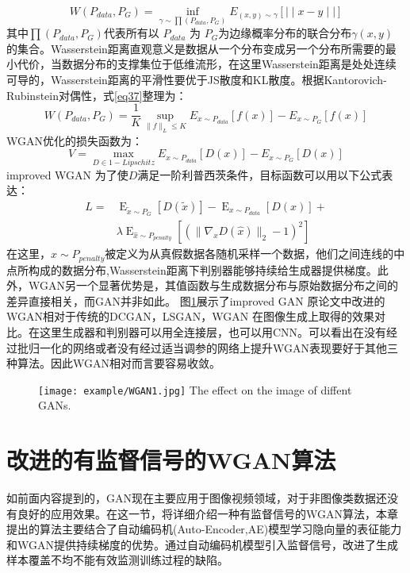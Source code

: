 \begin{equation}
\label{eq37}
W(P_{data},P_{G})= \inf \limits_{\gamma \sim \prod (P_{data},P_{G})} E_{(x,y)\sim\gamma}[\mid\mid x-y\mid\mid]
\end{equation}
其中${ \prod (P_{data},P_{G})}$代表所有以 $P_{data}$ 为 $P_{G}$为边缘概率分布的联合分布$\gamma(x,y)$ 的集合。Wasserstein距离直观意义是数据从一个分布变成另一个分布所需要的最小代价，当数据分布的支撑集位于低维流形，在这里Wasserstein距离是处处连续可导的，Wasserstein距离的平滑性要优于JS散度和KL散度。根据Kantorovich-Rubinstein对偶性，式\ref{eq37}整理为：
\begin{equation}
\label{eq38}
W(P_{data},P_{G})= \frac{1}{K} \sup \limits_{\| f \| _{L} \leq K} E_{x\sim P_{data}}[f(x)]-E_{x\sim P_{G}}[f(x)]
\end{equation}
WGAN优化的损失函数为：
\begin{equation}
\label{eq39}
V= \max \limits_{D\in 1- Lipschitz} E_{x\sim P_{data}}[D(x)]-E_{x\sim P_{G}}[D(x)]
\end{equation}
improved WGAN 为了使$D$满足一阶利普西茨条件，目标函数可以用以下公式表达：
\begin{equation}
\label{eq10}
\begin{aligned}
L=&\mathop{E}_{\tilde{x} \sim P_{G}}[D( \tilde{x})]- \mathop{E}_{x \sim P_{data}}[D(x)]+ \\&\lambda \mathop{E}_{\hat{x}\sim P_{ {penalty}}} [(\| \nabla _{  \hat{x}} D(\hat{x}) \|_{2} - 1)^{2}]
\end{aligned}
\end{equation}
在这里，$\hat{x}\sim P_{ {penalty}}$被定义为从真假数据各随机采样一个数据，他们之间连线的中点所构成的数据分布,Wasserstein距离下判别器能够持续给生成器提供梯度。此外，WGAN另一个显著优势是，其值函数与生成数据分布与原始数据分布之间的差异直接相关，而GAN并非如此。
图\ref{fig:GAN1}展示了improved GAN 原论文中改进的WGAN相对于传统的DCGAN，LSGAN，WGAN 在图像生成上取得的效果对比。在这里生成器和判别器可以用全连接层，也可以用CNN。可以看出在没有经过批归一化的网络或者没有经过适当调参的网络上提升WGAN表现要好于其他三种算法。因此WGAN相对而言要容易收敛。
\begin{figure}[htbp]
	\centering
	\texttt{[image: example/WGAN1.jpg]}
	\hspace{1cm}
	{The effect on the image of diffent GANs.}
	\label{fig:GAN1}
\end{figure}

\section{改进的有监督信号的WGAN算法}
如前面内容提到的，GAN现在主要应用于图像视频领域，对于非图像类数据还没有良好的应用效果。在这一节，将详细介绍一种有监督信号的WGAN算法，本章提出的算法主要结合了自动编码机(Auto-Encoder,AE)模型学习隐向量的表征能力和WGAN提供持续梯度的优势。通过自动编码机模型引入监督信号，改进了生成样本覆盖不均不能有效监测训练过程的缺陷。

